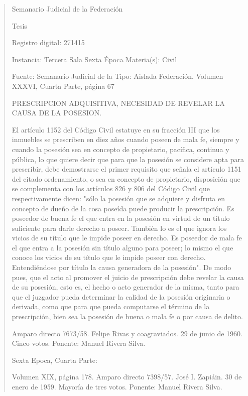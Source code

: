 \documentclass[11pt,a4paper]{article}
\begin{document}
\begin{quote}
                                                   Semanario Judicial de la Federación

                                                  Tesis

 Registro digital: 271415

 Instancia: Tercera Sala          Sexta Época                          Materia(s): Civil

                                  Fuente: Semanario Judicial de la     Tipo: Aislada
                                  Federación.
                                  Volumen XXXVI, Cuarta Parte,
                                  página 67


PRESCRIPCION ADQUISITIVA, NECESIDAD DE REVELAR LA CAUSA DE LA POSESION.


El artículo 1152 del Código Civil estatuye en su fracción III que los inmuebles se prescriben en diez
años cuando poseen de mala fe, siempre y cuando la posesión sea en concepto de propietario,
pacífica, continua y pública, lo que quiere decir que para que la posesión se considere apta para
prescribir, debe demostrarse el primer requisito que señala el artículo 1151 del citado ordenamiento,
o sea en concepto de propietario, disposición que se complementa con los artículos 826 y 806 del
Código Civil que respectivamente dicen: "sólo la posesión que se adquiere y disfruta en concepto de
dueño de la cosa poseída puede producir la prescripción. Es poseedor de buena fe el que entra en
la posesión en virtud de un título suficiente para darle derecho a poseer. También lo es el que
ignora los vicios de su título que le impide poseer en derecho. Es poseedor de mala fe el que entra
a la posesión sin título alguno para poseer; lo mismo el que conoce los vicios de su título que le
impide poseer con derecho. Entendiéndose por título la causa generadora de la posesión". De modo
pues, que el acto al promover el juicio de prescripción debe revelar la causa de su posesión, esto
es, el hecho o acto generador de la misma, tanto para que el juzgador pueda determinar la calidad
de la posesión originaria o derivada, como que para que pueda computarse el término de la
prescripción, bien sea la posesión de buena o mala fe o por causa de delito.


Amparo directo 7673/58. Felipe Rivas y coagraviados. 29 de junio de 1960. Cinco votos. Ponente:
Manuel Rivera Silva.

Sexta Epoca, Cuarta Parte:

Volumen XIX, página 178. Amparo directo 7398/57. José I. Zapiáin. 30 de enero de 1959. Mayoría
de tres votos. Ponente: Manuel Rivera Silva.


\end{quote}
\end{document}
